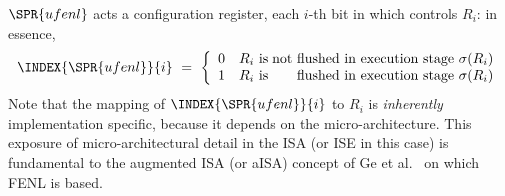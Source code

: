 $\SPR{ufenl}$
acts a configuration register, each $i$-th bit in which controls $R_i$: 
in essence, 
\[
\INDEX{\SPR{ufenl}}{i} ~=~ \left\{\begin{array}{ll@{\;}r}
                                  0 & \mbox{$R_i$ is} & \mbox{not flushed in execution stage $\sigma( R_i )$} \\
                                  1 & \mbox{$R_i$ is} & \mbox{    flushed in execution stage $\sigma( R_i )$} \\
                                  \end{array}
                             \right.
\]
Note that the mapping of 
$\INDEX{\SPR{ufenl}}{i}$
to 
$R_i$
is {\em inherently} implementation specific, because it depends on the
micro-architecture.  This exposure of micro-architectural detail in the
ISA (or ISE in this case) is fundamental to the augmented ISA (or aISA) 
concept of
Ge et al.~\cite{SCARV:GeYarHei:18}
on which FENL is based.

